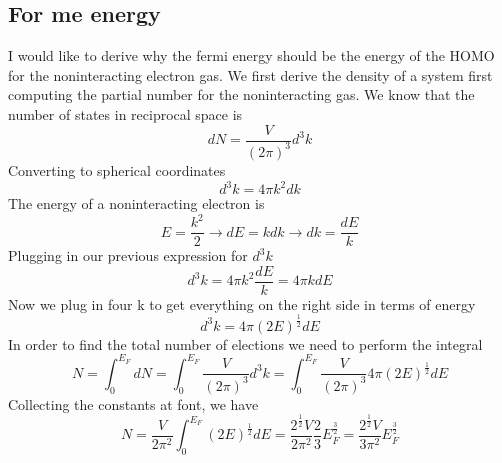 \documentclass[12pt]{article}
\begin{document}
\subsection{For me energy}
I would like to derive why the fermi energy should be the energy of the HOMO for the noninteracting electron gas. We first derive the density of a system first computing the partial number for the noninteracting gas. We know that the number of states in reciprocal space is
\begin{equation}
    dN = \frac{V}{(2\pi )^3}d^3k
\end{equation}
Converting to spherical coordinates
\begin{equation}
    d^3k = 4\pi k^2 dk
\end{equation}
The energy of a noninteracting electron is
\begin{equation}
    E = \frac{k^2}{2} \rightarrow dE = k dk \rightarrow dk = \frac{dE}{k}
\end{equation}
Plugging in our previous expression for $d^3k$
\begin{equation}
    d^3k = 4\pi k^2 \frac{dE}{k} = 4\pi k dE
\end{equation}
Now we plug in four k to get everything on the right side in terms of energy
\begin{equation}
    d^3k = 4\pi (2E)^{\frac{1}{2}} dE
\end{equation}
In order to find the total number of elections we need to perform the integral
\begin{equation}
    N=\int_{0}^{E_{F}}dN=\int_{0}^{E_{F}} \frac{V}{(2\pi )^3}d^3k=\int_{0}^{E_{F}} \frac{V}{(2\pi )^3} 4\pi (2E)^{\frac{1}{2}} dE 
\end{equation}
Collecting the constants at font, we have
\begin{equation}
    N=\frac{V}{2\pi^2} \int_{0}^{E_{F}} (2E)^{\frac{1}{2}} dE = \frac{2^{\frac{1}{2}} V}{2\pi^2} \frac{2}{3} E_{F}^{\frac{3}{2}} = \frac{2^{\frac{1}{2}} V}{3\pi^2} E_{F}^{\frac{3}{2}}
\end{equation}
\end{document}
